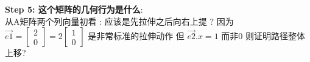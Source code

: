 \documentclass[12pt]{article}
\begin{document}
\begin{flushleft}

    \noindent\textbf{Step 5: 这个矩阵的几何行为是什么}: \\
    从A矩阵两个列向量初看 :
    应该是先拉伸之后向右上提 ?
    因为 $\vec{e1} = \begin{bmatrix}
            2 \\
            0
        \end{bmatrix} = 2 \begin{bmatrix}
            1 \\
            0
        \end{bmatrix}$ 是非常标准的拉伸动作
    但  $\vec{e2}.x = 1$ 而非0 则证明路径整体上移?

\end{flushleft}
\end{document}
